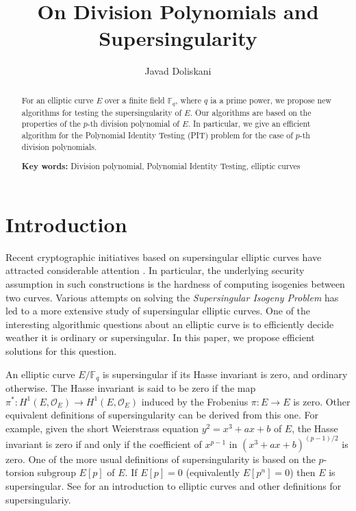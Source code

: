 \documentclass[12pt]{article}
\title{On Division Polynomials and Supersingularity}
\author[1]{Javad Doliskani}
\affil[1]{\small Institute for Quantum Computing, University of Waterloo}
\date{}
\theoremstyle{plain}
\theoremstyle{definition}
\def\F{\ensuremath{\mathbb{F}}}
\begin{document}
\maketitle

\begin{abstract}
	\noindent For an elliptic curve $E$ over a finite field $\F_q$, where $q$ ia a prime power, we 
	propose new algorithms for testing the supersingularity of $E$. Our algorithms are based on the 
	properties of the $p$-th division polynomial of $E$. In particular, we give an efficient 
	algorithm for the Polynomial Identity Testing (PIT) problem for the case of $p$-th division 
	polynomials.
	
	\vspace*{1cm}
	\noindent\textbf{Key words:} Division polynomial, Polynomial Identity Testing, elliptic curves
\end{abstract}



\section{Introduction}
\label{sec:intro}

Recent cryptographic initiatives based on supersingular elliptic curves have attracted considerable 
attention \cite{Jao2011, Jao2014, Charles2009}. In particular, the underlying security assumption 
in such constructions is the hardness of computing isogenies between two curves. Various attempts 
on solving the \textit{Supersingular Isogeny Problem} has led to a more extensive study of 
supersingular elliptic curves. One of the interesting algorithmic questions about an elliptic curve 
is to efficiently decide weather it is ordinary or supersingular. In this paper, we propose 
efficient solutions for this question.

An elliptic curve $E / \F_q$ is supersingular if its Hasse invariant is zero, and ordinary 
otherwise. The Hasse invariant is said to be zero if the map $\pi^*: H^1(E, \mathscr{O}_E) 
\rightarrow H^1(E, \mathscr{O}_E)$ induced by the Frobenius $\pi: E \rightarrow E$ is zero. Other 
equivalent definitions of supersingularity can be derived from this one. For example, given the 
short Weierstrass equation $y^2 = x^3 + ax + b$ of $E$, the Hasse invariant is zero if and only if 
the coefficient of $x^{p - 1}$ in $(x^3 + ax + b)^{(p - 1) / 2}$ is zero. One of the more usual 
definitions of supersingularity is based on the $p$-torsion subgroup $E[p]$ of $E$. If $E[p] = 0$ 
(equivalently $E[p^n] = 0$) then $E$ is supersingular. See \cite{Husemoeller1987} for an 
introduction to elliptic curves and other definitions for supersingulariy. 
\end{document}
